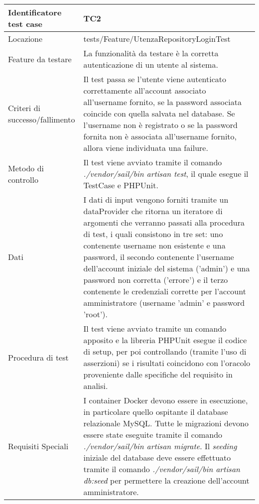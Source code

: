 \begin{tabular}{|| l | p{25em} ||} 
	\hline
	Identificatore test case & TC2\\
	\hline
	Locazione & tests/Feature/UtenzaRepositoryLoginTest\\
	\hline
	Feature da testare & La funzionalità da testare è la corretta autenticazione di un utente al sistema.\\
	\hline
	Criteri di successo/fallimento & Il test passa se l'utente viene autenticato correttamente all'account associato all'username fornito, se la password associata coincide con quella salvata nel database. Se l'username non è registrato o se la password fornita non è associata all'username fornito, allora viene individuata una failure.\\
	\hline
	Metodo di controllo & Il test viene avviato tramite il comando \emph{./vendor/sail/bin artisan test}, il quale esegue il TestCase e PHPUnit.\\
	\hline
	Dati & I dati di input vengono forniti tramite un dataProvider che ritorna un iteratore di argomenti che verranno passati alla procedura di test, i quali consistono in tre set: uno contenente username non esistente e una password, il secondo contenente l'username dell'account iniziale del sistema ('admin') e una password non corretta ('errore') e il terzo contenente le credenziali corrette per l'account amministratore (username 'admin' e password 'root').\\
	\hline
	Procedura di test & Il test viene avviato tramite un comando apposito e la libreria PHPUnit esegue il codice di setup, per poi controllando (tramite l'uso di asserzioni) se i risultati coincidono con l'oracolo proveniente dalle specifiche del requisito in analisi.\\
	\hline
	Requisiti Speciali & I container Docker devono essere in esecuzione, in particolare quello ospitante il database relazionale MySQL. Tutte le migrazioni devono essere state eseguite tramite il comando \emph{./vendor/sail/bin artisan migrate}. Il \emph{seeding} iniziale del database deve essere effettuato tramite il comando \emph{./vendor/sail/bin artisan db:seed} per permettere la creazione dell'account amministratore.\\
	\hline
\end{tabular}

